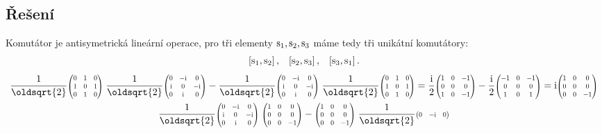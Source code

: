 \documentclass[10pt,a4paper]{article}
\newcommand{\comm}[2]{\left[ #1, #2 \right]}
\newcommand{\const}[1]{\text{\rmfamily\upshape #1}}
\newcommand{\mat}[1]{
    \begin{pmatrix}
        #1
    \end{pmatrix}
}
\newcommand{\smat}[2][1]{
    \scalebox{#1}{$\mat{#2}$}
}
\renewcommand{\i}{\const{i}}
\begin{document}
\subsection{Řešení}
Komutátor je antisymetrická lineární operace, pro tři elementy $\const{s}_1, \const{s}_2, \const{s}_3$ máme tedy tři unikátní komutátory:
\begin{align*}
    \comm{\const{s}_1}{\const{s}_2},
    \;\;\;
    \comm{\const{s}_2}{\const{s}_3},
    \;\;\;
    \comm{\const{s}_3}{\const{s}_1}.
\end{align*}
\begin{gather*}
    \frac{1}{\oldsqrt{2}} \smat[0.7]{
        0 & 1 & 0 \\
        1 & 0 & 1 \\
        0 & 1 & 0
    }
    \;
    \frac{1}{\oldsqrt{2}} \smat[0.7]{
        0 & -\i & 0 \\
        \i & 0 & -\i \\
        0 & \i & 0
    }
    -
    \frac{1}{\oldsqrt{2}} \smat[0.7]{
        0 & -\i & 0 \\
        \i & 0 & -\i \\
        0 & \i & 0
    }
    \;
    \frac{1}{\oldsqrt{2}} \smat[0.7]{
        0 & 1 & 0 \\
        1 & 0 & 1 \\
        0 & 1 & 0
    }
    =
    \frac{\i}{2} \smat[0.7]{
        1 & 0 & -1 \\
        0 & 0 &  0 \\
        1 & 0 & -1
    }
    -
    \frac{\i}{2} \smat[0.7]{
        -1 & 0 & -1 \\
        0 & 0 & 0 \\
        1 & 0 & 1
    }
    =
    \i \smat[0.7]{
        1 & 0 & 0 \\
        0 & 0 & 0 \\
        0 & 0 & -1
    }
    \\
    \frac{1}{\oldsqrt{2}} \smat[0.7]{
        0 & -\i & 0 \\
        \i & 0 & -\i \\
        0 & \i & 0
    }
    \;
    \smat[0.7]{
        1 & 0 & 0 \\
        0 & 0 & 0 \\
        0 & 0 & -1
    }
    -
    \smat[0.7]{
        1 & 0 & 0 \\
        0 & 0 & 0 \\
        0 & 0 & -1
    }
    \;
    \frac{1}{\oldsqrt{2}} \smat[0.7]{
        0 & -\i & 0 \\
}
\end{gather*}
\end{document}
